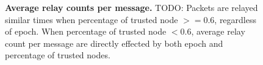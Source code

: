 \documentclass[11pt]{article}
\begin{document}
\begin{figure}[h!]
\center
{}
\hfill
{}
\caption{{\bf Average relay counts per message.}
TODO: Packets are relayed similar times when percentage of trusted node $>= 0.6$, regardless of epoch.  
When percentage of trusted node $<0.6$, average relay count per message are directly effected by both epoch and percentage of trusted nodes. 
}
\label{fig:relay_per_message}
\end{figure}
\end{document}
